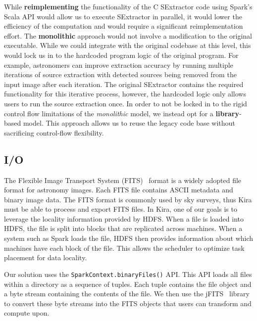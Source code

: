 \documentclass[conference]{IEEEtran}
\begin{document}
While \textbf{reimplementing} the functionality of the C SExtractor code using Spark's Scala API 
would allow us to execute SExtractor in parallel, it would lower the efficiency of the computation 
and would require a significant reimplementation effort.
The \textbf{monolithic} approach would not involve a modification to the original executable. While we could 
integrate with the original codebase at this level, this would lock us in to the hardcoded program logic 
of the original program. 
For example, astronomers can improve extraction accuracy by running multiple iterations of source
extraction with detected sources being removed from the input image after each iteration. 
The original SExtractor contains the required functionality for this iterative process, however, the hardcoded
logic only allows users to run the source extraction once.  
In order to not be locked in to the rigid control flow limitations of the \emph{monolithic} model, 
we instead opt for a \textbf{library}-based model.
This approach allows us to reuse the legacy code base without sacrificing control-flow flexibility.  





\subsection{I/O}
\label{sec:Design-I/O}
The Flexible Image Transport System (FITS)~\cite{wells81} format is a widely adopted file format for astronomy
images. Each FITS file contains ASCII metadata and binary image data.
The FITS format is commonly used by sky surveys, thus Kira must be able to process and export FITS files.
In Kira, one of our goals is to leverage the locality information provided by HDFS. When a file is loaded into 
HDFS, the file is split into blocks that are replicated across machines. When a system such as Spark loads the file, 
HDFS then provides information about which machines have each block of the file. This allows the
scheduler to optimize task placement for data locality.



Our solution uses the \texttt{SparkContext.binaryFiles()} API.
This API loads all files within a directory as a sequence of tuples. Each tuple contains the file object and a byte
stream containing the contents of the file. We then use the jFITS~\cite{jfits} library to convert these byte streams 
into the FITS objects that users can transform and compute upon. 

 
\end{document}
